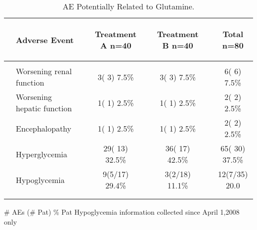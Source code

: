\documentclass[dvips,10pt]{article}
\begin{document}
\begin{table}[t]
\caption
{ AE Potentially Related to Glutamine. }
\begin{center}
\begin{tabular}{ @{}l@{}
@{}l@{}@{}p{1.5em}@{}@{}c@{}@{}p{1.5em}@{}@{}c@{}@{}p{1.5em}@{}@{}c@{}
}
\hline

& \parbox{6em}{\begin{center}Adverse Event\end{center}} && \parbox{6em}{\begin{center}Treatment A n=40\end{center}} && \parbox{6em}{\begin{center}Treatment B n=40\end{center}} && \parbox{6em}{\begin{center}Total n=80\end{center}} \\

\hline

\\
& Worsening renal function && 3(  3)  7.5\% && 3(  3)  7.5\% && 6(  6)  7.5\% \\
& Worsening hepatic function && 1(  1)  2.5\% && 1(  1)  2.5\% && 2(  2)  2.5\% \\
& Encephalopathy && 1(  1)  2.5\% && 1(  1)  2.5\% && 2(  2)  2.5\% \\
& Hyperglycemia && 29( 13) 32.5\% && 36( 17) 42.5\% && 65( 30) 37.5\% \\
& Hypoglycemia && 9(5/17) 29.4\% && 3(2/18) 11.1\% && 12(7/35) 20.0 \\
\\
\hline \\

\end{tabular}


\parbox{ 5in }{ \# AEs (\# Pat) \% Pat \newline Hypoglycemia information collected since April 1,2008 only } \\
 \vspace{1em}\end{center}
 \end{table}
\clearpage
\end{document}
